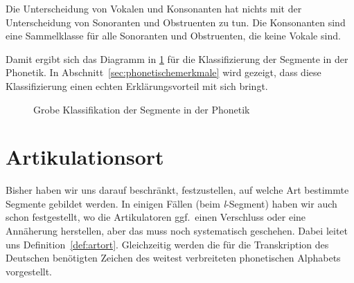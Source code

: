 

Die Unterscheidung von Vokalen und Konsonanten hat nichts mit der Unterscheidung von Sonoranten und Obstruenten zu tun.
Die Konsonanten sind eine Sammelklasse für alle Sonoranten und Obstruenten, die keine Vokale sind.


Damit ergibt sich das Diagramm in \ref{fig:lautklassen} für die Klassifizierung der Segmente in der Phonetik.
In Abschnitt~\ref{sec:phonetischemerkmale} wird gezeigt, dass diese Klassifizierung einen echten Erklärungsvorteil mit sich bringt.

\begin{figure}
  \centering
  \caption{Grobe Klassifikation der Segmente in der Phonetik}
  \label{fig:lautklassen}
\end{figure}

\section{Artikulationsort}

\label{sec:artikulationsort}

Bisher haben wir uns darauf beschränkt, festzustellen, auf welche Art bestimmte Segmente gebildet werden.
In einigen Fällen (\zB beim \textit{l}-Segment) haben wir auch schon festgestellt, wo die Artikulatoren ggf.\ einen Verschluss oder eine Annäherung herstellen, aber das muss noch systematisch geschehen.
Dabei leitet uns Definition~\ref{def:artort}.
Gleichzeitig werden die für die Transkription des Deutschen benötigten Zeichen des weitest verbreiteten phonetischen Alphabets vorgestellt.

